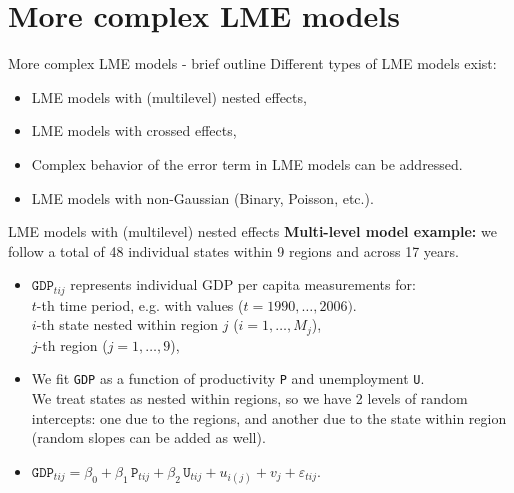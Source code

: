\documentclass{beamer}
\begin{document}
\section{More complex LME models}
\begin{frame}{More complex LME models - brief outline}
Different types of LME models exist:\\
\bigskip
\begin{itemize}
\item LME models with (multilevel) nested effects,
\medskip
\item LME models with crossed effects,
\medskip
\item Complex behavior of the error term in LME models can be addressed.
\medskip
\item LME models with non-Gaussian (Binary, Poisson, etc.).
\end{itemize}
\end{frame}
\begin{frame}{LME models with (multilevel) nested effects}
\textbf{Multi-level model example:} we follow a total of 48 individual states within 9 regions and across 17 years.
\medskip
\begin{itemize}
\item $\texttt{GDP}_{tij}$ represents individual GDP per capita measurements for:\\
\smallskip
$t$-th time period, e.g. with values ($t= 1990, \dots, 2006)$.\\
$i$-th state nested within region $j$ ($i=1,\dots,M_j$),\\
$j$-th region ($j=1,\dots,9$),\\



\medskip
\item We fit \texttt{GDP} as a function of productivity \texttt{P} and unemployment \texttt{U}.\\
\smallskip
We treat states as nested within regions, so we have 2 levels of random intercepts: one due to the regions, and another due to the state within region (random slopes can be added as well).
\bigskip
\item $\texttt{GDP}_{tij} = \beta_0 + \beta_1 \, \texttt{P}_{tij} 
+ \beta_2 \, \texttt{U}_{tij} + u_{i(j)} + v_j  + \varepsilon_{tij}.$
\end{itemize}
\end{frame}
\end{document}

